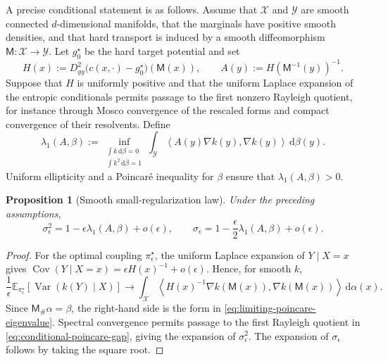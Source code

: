 \documentclass[11pt]{article}
\newtheorem{proposition}{Proposition}[section]
\theoremstyle{definition}
\theoremstyle{remark}
\newcommand{\E}{\mathbb{E}}
\newcommand{\eps}{\epsilon}
\newcommand{\al}{\alpha}
\newcommand{\be}{\beta}
\newcommand{\Xx}{\mathcal{X}}
\newcommand{\Yy}{\mathcal{Y}}
\newcommand{\dd}{\,\mathrm{d}}
\newcommand{\ip}[2]{\left\langle #1,#2\right\rangle}
\DeclareMathOperator{\Cov}{Cov}
\DeclareMathOperator{\Var}{Var}
\begin{document}
A precise conditional statement is as follows. Assume that $\Xx$ and $\Yy$
are smooth connected $d$-dimensional manifolds, that the marginals have
positive smooth densities, and that hard transport is induced by a
smooth diffeomorphism $\mathsf M:\Xx\to\Yy$. Let $g_0^\star$ be the hard
target potential and set
\begin{equation}
  \label{eq:monge-transverse-hessian}
  H(x)
  :=
  D_{yy}^2\bigl(c(x,\cdot)-g_0^\star\bigr)(\mathsf M(x)),
  \qquad
  A(y):=H(\mathsf M^{-1}(y))^{-1}.
\end{equation}
Suppose that $H$ is uniformly positive and that the uniform Laplace
expansion of the entropic conditionals permits passage to the first
nonzero Rayleigh quotient, for instance through Mosco convergence of
the rescaled forms and compact convergence of their resolvents. Define
\begin{equation}
  \label{eq:limiting-poincare-eigenvalue}
  \lambda_1(A,\be)
  :=
  \inf_{\substack{\int k\dd\be=0\\\int k^2\dd\be=1}}
  \int_{\Yy}\ip{A(y)\nabla k(y)}{\nabla k(y)}\dd\be(y).
\end{equation}
Uniform ellipticity and a Poincar\'e inequality for $\be$ ensure that
$\lambda_1(A,\be)>0$.

\begin{proposition}[Smooth small-regularization law]
  \label{prop:smooth-small-epsilon}
  Under the preceding assumptions,
  \begin{equation}
    \label{eq:smooth-small-epsilon-rate}
    \sigma_\eps^2
    =
    1-\eps\lambda_1(A,\be)+o(\eps),
    \qquad
    \sigma_\eps
    =
    1-\frac\eps2\lambda_1(A,\be)+o(\eps).
  \end{equation}
\end{proposition}

\begin{proof}
For the optimal coupling $\pi_\eps^\star$, the uniform Laplace expansion
of $Y\mid X=x$ gives
$\Cov(Y\mid X=x)=\eps H(x)^{-1}+o(\eps)$. Hence, for smooth $k$,
\[
  \frac1\eps
  \E_{\pi_\eps^\star}[\Var(k(Y)\mid X)]
  \longrightarrow
  \int_{\Xx}
  \ip{H(x)^{-1}\nabla k(\mathsf M(x))}
     {\nabla k(\mathsf M(x))}\dd\al(x).
\]
Since $\mathsf M_\#\al=\be$, the right-hand side is the form in
\eqref{eq:limiting-poincare-eigenvalue}. Spectral convergence permits
passage to the first Rayleigh quotient in
\eqref{eq:conditional-poincare-gap}, giving the expansion of
$\sigma_\eps^2$. The expansion of $\sigma_\eps$ follows by taking the
square root.
\end{proof}
\end{document}
